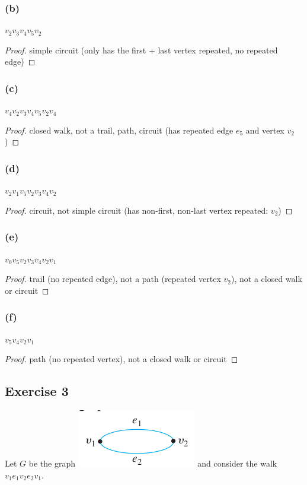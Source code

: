 \documentclass[14pt]{extarticle}
\begin{document}
\subsubsection{(b)}
\(v_2v_3v_4v_5v_2\)
\begin{proof}
simple circuit (only has the first + last vertex repeated, no repeated edge)
\end{proof}

\subsubsection{(c)}
\(v_4v_2v_3v_4v_5v_2v_4\)
\begin{proof}
closed walk, not a trail, path, circuit (has repeated edge \(e_5\) and vertex \(v_2\))
\end{proof}

\subsubsection{(d)}
\(v_2v_1v_5v_2v_3v_4v_2\)
\begin{proof}
circuit, not simple circuit (has non-first, non-last vertex repeated: \(v_2\))
\end{proof}

\subsubsection{(e)}
\(v_0v_5v_2v_3v_4v_2v_1\)
\begin{proof}
trail (no repeated edge), not a path (repeated vertex \(v_2\)), not a closed walk or circuit 
\end{proof}

\subsubsection{(f)}
\(v_5v_4v_2v_1\)

\begin{proof}
path (no repeated vertex), not a closed walk or circuit
\end{proof}

\subsection{Exercise 3}
Let \(G\) be the graph \includegraphics[scale=0.6]{../images/10.1.3.png} and consider the walk \(v_1e_1v_2e_2v_1\).
\end{document}
